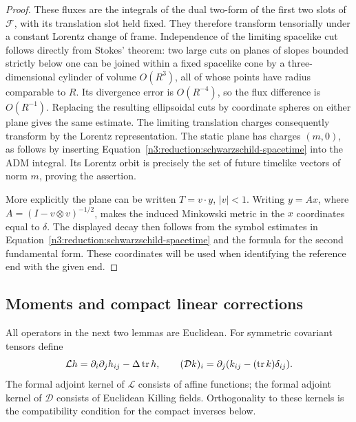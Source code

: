 \begin{proof}
These fluxes are the integrals of the dual two-form of the first two
slots of $\mathcal F$, with its translation slot held fixed.  They
therefore transform tensorially under a constant Lorentz change of
frame.  Independence of the limiting spacelike cut follows directly
from Stokes' theorem: two large cuts on planes of slopes bounded
strictly below one can be joined within a fixed spacelike cone by a
three-dimensional cylinder of volume $O(R^3)$, all of whose points have
radius comparable to $R$.  Its divergence error is $O(R^{-4})$, so the
flux difference is $O(R^{-1})$.  Replacing the resulting ellipsoidal cuts
by coordinate spheres on either plane gives the same estimate.  The
limiting translation charges consequently transform by the Lorentz
representation.  The static plane has charges $(m,0)$, as follows by
inserting Equation~\eqref{n3:reduction:schwarzschild-spacetime} into the ADM
integral.  Its Lorentz orbit is precisely the set of future timelike
vectors of norm $m$, proving the assertion.

More explicitly the plane can be written $T=v\cdot y$, $|v|<1$.
Writing $y=Ax$, where
$A=(I-v\otimes v)^{-1/2}$, makes the induced Minkowski metric in the
$x$ coordinates equal to $\delta$.  The displayed decay then follows
from the symbol estimates in
Equation~\eqref{n3:reduction:schwarzschild-spacetime} and the formula for
the second fundamental form.  These coordinates will be used when
identifying the reference end with the given end.
\end{proof}

\subsection{Moments and compact linear corrections}

All operators in the next two lemmas are Euclidean.  For symmetric
covariant tensors define
\begin{equation}
 \label{n3:reduction:linear-operators}
 \mathcal Lh=\partial_i\partial_jh_{ij}-\Delta\operatorname{tr} h,
 \qquad
 (\mathcal Dk)_i=\partial_j(k_{ij}-(\operatorname{tr} k)\delta_{ij}).
\end{equation}
The formal adjoint kernel of $\mathcal L$ consists of affine functions;
the formal adjoint kernel of $\mathcal D$ consists of Euclidean Killing
fields.  Orthogonality to these kernels is the compatibility condition
for the compact inverses below.

